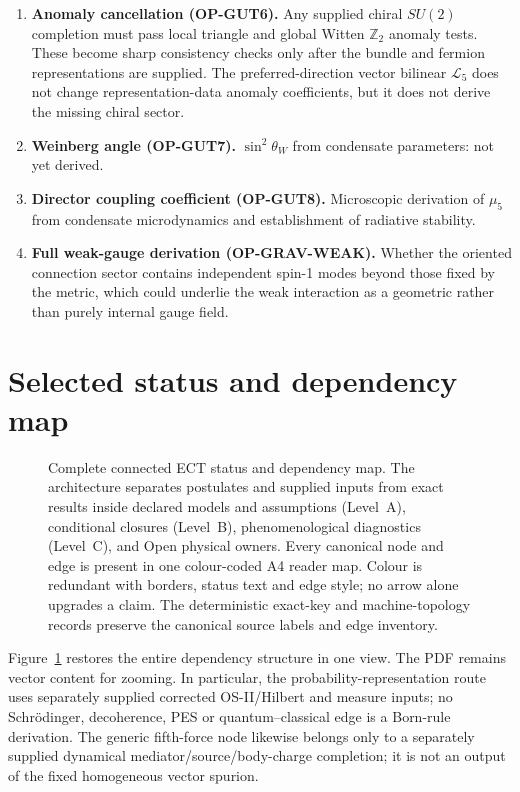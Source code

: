 \documentclass[11pt,a4paper]{article}
\begin{document}
\begin{enumerate}
\item \textbf{Anomaly cancellation (OP-GUT6).} Any supplied chiral $SU(2)$ completion must pass local triangle and global Witten $\mathbb{Z}_2$ anomaly tests.  These become sharp consistency checks only after the bundle and fermion representations are supplied.  The preferred-direction vector bilinear $\mathcal{L}_5$ does not change representation-data anomaly coefficients, but it does not derive the missing chiral sector.

\item \textbf{Weinberg angle (OP-GUT7).} $\sin^2\!\theta_W$ from condensate parameters: not yet derived.

\item \textbf{Director coupling coefficient (OP-GUT8).} Microscopic derivation of $\mu_5$ from condensate microdynamics and establishment of radiative stability.

\item \textbf{Full weak-gauge derivation (OP-GRAV-WEAK).} Whether the oriented connection sector contains independent spin-1 modes beyond those fixed by the metric, which could underlie the weak interaction as a geometric rather than purely internal gauge field.
\end{enumerate}

\section{Selected status and dependency map}

\begin{figure}[H]
\caption{Complete connected ECT status and dependency map. The architecture separates
postulates and supplied inputs from exact results inside declared models and
assumptions (Level~A), conditional closures (Level~B), phenomenological
diagnostics (Level~C), and Open physical owners.  Every canonical node and
edge is present in one colour-coded A4 reader map. Colour is redundant with
borders, status text and edge style; no arrow alone upgrades a claim.  The
deterministic exact-key and machine-topology records preserve the canonical
source labels and edge inventory.}
\label{fig:pop_fullmap}
\end{figure}

\enlargethispage{2\baselineskip}
Figure~\ref{fig:pop_fullmap} restores the entire dependency structure in one
view.  The PDF remains vector content for zooming.  In particular, the
probability-representation route uses separately supplied corrected
OS-II/Hilbert and measure inputs; no Schr\"odinger, decoherence, PES or
quantum--classical edge is a Born-rule derivation.  The generic fifth-force
node likewise belongs only to a separately supplied dynamical
mediator/source/body-charge completion; it is not an output of the fixed
homogeneous vector spurion.
\end{document}
